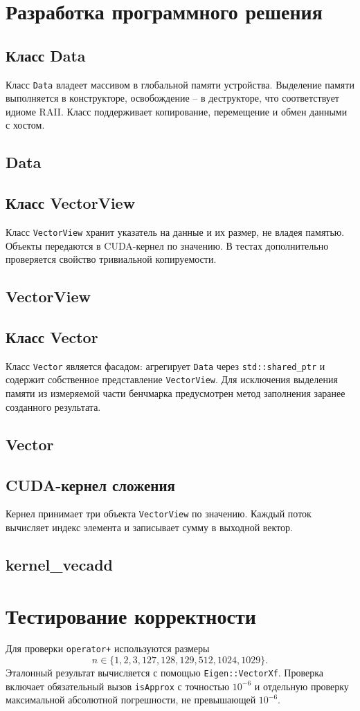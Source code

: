 \documentclass[a4paper,14pt]{article}
\newcommand{\codefile}[2]{%
  \subsection*{#1}%
}
\begin{document}
\section{Разработка программного решения}
\subsection{Класс Data}
Класс \texttt{Data} владеет массивом в глобальной памяти устройства. Выделение памяти выполняется в конструкторе, освобождение -- в деструкторе, что соответствует идиоме RAII. Класс поддерживает копирование, перемещение и обмен данными с хостом.
\codefile{Data}{core/include/Data.cuh}

\subsection{Класс VectorView}
Класс \texttt{VectorView} хранит указатель на данные и их размер, не владея памятью. Объекты передаются в CUDA-кернел по значению. В тестах дополнительно проверяется свойство тривиальной копируемости.
\codefile{VectorView}{core/include/VectorView.cuh}

\subsection{Класс Vector}
Класс \texttt{Vector} является фасадом: агрегирует \texttt{Data} через \texttt{std::shared\_ptr} и содержит собственное представление \texttt{VectorView}. Для исключения выделения памяти из измеряемой части бенчмарка предусмотрен метод заполнения заранее созданного результата.
\codefile{Vector}{core/include/Vector.cuh}

\subsection{CUDA-кернел сложения}
Кернел принимает три объекта \texttt{VectorView} по значению. Каждый поток вычисляет индекс элемента и записывает сумму в выходной вектор.
\codefile{kernel\_vecadd}{core/include/kernel_vecadd.cuh}

\section{Тестирование корректности}
Для проверки \texttt{operator+} используются размеры
\[
 n \in \{1,2,3,127,128,129,512,1024,1029\}.
\]
Эталонный результат вычисляется с помощью \texttt{Eigen::VectorXf}. Проверка включает обязательный вызов \texttt{isApprox} с точностью $10^{-6}$ и отдельную проверку максимальной абсолютной погрешности, не превышающей $10^{-6}$.
\end{document}
